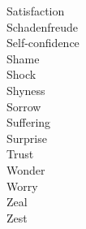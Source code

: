 \begin{multicols}{2}
\begin{description}
\item[Satisfaction]

\item[Schadenfreude]

\item[Self-confidence]

\item[Shame]

\item[Shock]

\item[Shyness]

\item[Sorrow]

\item[Suffering]

\item[Surprise]

\item[Trust]

\item[Wonder]

\item[Worry]

\item[Zeal]

\item[Zest]

\end{description}
\end{multicols}
